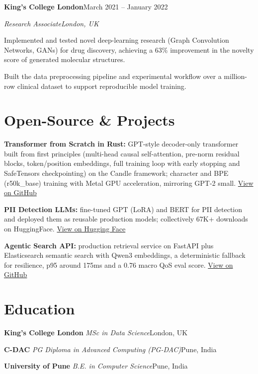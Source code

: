 \documentclass[10pt,a4paper]{article}
\newcommand{\entry}[4]{%
  {\color{company}\bfseries #1}\hfill {\color{muted}#2}\par
  \vspace{1pt}
  {\itshape #3}\hfill {\color{muted}\itshape #4}\par
  \vspace{3pt}%
}
\newcommand{\sep}{\,\textcolor{accent!60}{\textbar}\,}
\begin{document}
\entry{King's College London}{March 2021 -- January 2022}{Research Associate}{London, UK}
\begin{tight}
  \item Implemented and tested novel deep-learning research (Graph Convolution Networks, GANs) for drug discovery, achieving a 63\% improvement in the novelty score of generated molecular structures.
  \item Built the data preprocessing pipeline and experimental workflow over a million-row clinical dataset to support reproducible model training.
\end{tight}

\section{Open-Source \& Projects}
\begin{tight}
  \item \textbf{Transformer from Scratch in Rust:} GPT-style decoder-only transformer built from first principles (multi-head causal self-attention, pre-norm residual blocks, token/position embeddings, full training loop with early stopping and SafeTensors checkpointing) on the Candle framework; character and BPE (r50k\_base) training with Metal GPU acceleration, mirroring GPT-2 small. \href{https://github.com/abhijeetscode/transformer-rust}{View on GitHub}
  \item \textbf{PII Detection LLMs:} fine-tuned GPT (LoRA) and BERT for PII detection and deployed them as reusable production models; collectively 67K+ downloads on HuggingFace. \href{https://huggingface.co/ab-ai/pii_model}{View on Hugging Face}
  \item \textbf{Agentic Search API:} production retrieval service on FastAPI plus Elasticsearch semantic search with Qwen3 embeddings, a deterministic fallback for resilience, p95 around 175ms and a 0.76 macro QoS eval score. \href{https://github.com/abhijeetscode/search-agent}{View on GitHub}
\end{tight}

\section{Education}
{\color{company}\bfseries King's College London}\sep{\itshape MSc in Data Science}\hfill {\color{muted}London, UK}\par\vspace{1pt}
{\color{company}\bfseries C-DAC}\sep{\itshape PG Diploma in Advanced Computing (PG-DAC)}\hfill {\color{muted}Pune, India}\par\vspace{1pt}
{\color{company}\bfseries University of Pune}\sep{\itshape B.E. in Computer Science}\hfill {\color{muted}Pune, India}\par
\end{document}
